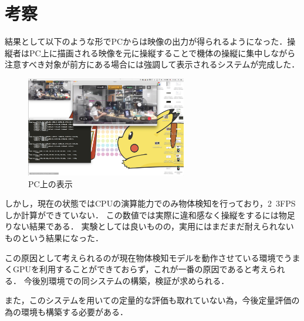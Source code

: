 \section{考察}
結果として以下のような形でPCからは映像の出力が得られるようになった．操縦者はPC上に描画される映像を元に操縦することで機体の操縦に集中しながら注意すべき対象が前方にある場合には強調して表示されるシステムが完成した．
\begin{figure}[htbp]
  \begin{center}
    \includegraphics[clip,width=7.0cm]{img/sys-image.png}
    \caption{PC上の表示}
    \label{fig:sys}
  \end{center}
\end{figure}


しかし，現在の状態ではCPUの演算能力でのみ物体検知を行っており，2~3FPSしか計算ができていない．
この数値では実際に違和感なく操縦をするには物足りない結果である．
実験としては良いものの，実用にはまだまだ耐えられないものという結果になった．

この原因として考えられるのが現在物体検知モデルを動作させている環境でうまくGPUを利用することができておらず，これが一番の原因であると考えられる．
今後別環境での同システムの構築，検証が求められる．


また，このシステムを用いての定量的な評価も取れていない為，今後定量評価の為の環境も構築する必要がある．

